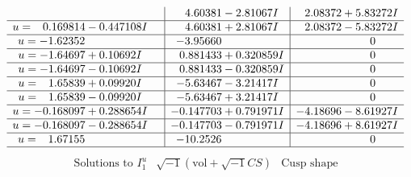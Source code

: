 \documentclass[1p]{elsarticle_modified}
\theoremstyle{definition}
\newcommand{\I}{\sqrt{-1}}
\begin{document}
$$\begin{array}{c|c|c}
 & \phantom{-}4.60381 - 2.81067 I & \phantom{-}2.08372 + 5.83272 I \\ \hline\begin{aligned}
u &= \phantom{-}0.169814 - 0.447108 I\end{aligned}
 & \phantom{-}4.60381 + 2.81067 I & \phantom{-}2.08372 - 5.83272 I \\ \hline\begin{aligned}
u &= -1.62352\phantom{ +0.000000I}\end{aligned}
 & -3.95660\phantom{ +0.000000I} & \phantom{-0.000000 } 0 \\ \hline\begin{aligned}
u &= -1.64697 + 0.10692 I\end{aligned}
 & \phantom{-}0.881433 + 0.320859 I & \phantom{-0.000000 } 0 \\ \hline\begin{aligned}
u &= -1.64697 - 0.10692 I\end{aligned}
 & \phantom{-}0.881433 - 0.320859 I & \phantom{-0.000000 } 0 \\ \hline\begin{aligned}
u &= \phantom{-}1.65839 + 0.09920 I\end{aligned}
 & -5.63467 - 3.21417 I & \phantom{-0.000000 } 0 \\ \hline\begin{aligned}
u &= \phantom{-}1.65839 - 0.09920 I\end{aligned}
 & -5.63467 + 3.21417 I & \phantom{-0.000000 } 0 \\ \hline\begin{aligned}
u &= -0.168097 + 0.288654 I\end{aligned}
 & -0.147703 + 0.791971 I & -4.18696 - 8.61927 I \\ \hline\begin{aligned}
u &= -0.168097 - 0.288654 I\end{aligned}
 & -0.147703 - 0.791971 I & -4.18696 + 8.61927 I \\ \hline\begin{aligned}
u &= \phantom{-}1.67155\phantom{ +0.000000I}\end{aligned}
 & -10.2526\phantom{ +0.000000I} & \phantom{-0.000000 } 0\\
 \hline 
 \end{array}$$\newpage$$\begin{array}{c|c|c}  
\text{Solutions to }I^u_{1}& \I (\text{vol} + \sqrt{-1}CS) & \text{Cusp shape}\\
 \hline 
\begin{aligned}

\end{aligned}
\end{array}$$
\end{document}
